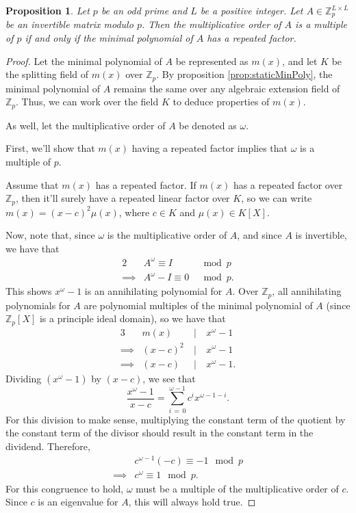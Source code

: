 \documentclass[12pt, a4paper, reqno]{amsart}
\newtheorem{prop}{Proposition}
\newcommand\divides{\ | \ }
\begin{document}
	\begin{prop}
		Let $p$ be an odd prime and $L$ be a positive integer. Let $A \in \mathds{Z}_{p}^{L \times L}$ be an invertible matrix modulo $p$. Then the multiplicative order of
		$A$ is a multiple of $p$ if and only if the minimal polynomial of $A$ has a repeated factor.
	\end{prop}
	\begin{proof}
		Let the minimal polynomial of $A$ be represented as $m(x)$, and let $K$ be the splitting field of $m(x)$ over $\mathds{Z}_p$. By proposition 
		\ref{prop:staticMinPoly}, the minimal polynomial of $A$ remains the same over any algebraic extension field of $\mathds{Z}_p$. Thus, we 
		can work over the field $K$ to deduce properties of $m(x)$.
		
		As well, let the multiplicative order of $A$ be denoted as $\omega$.
		
		First, we'll show that $m(x)$ having a repeated factor implies that $\omega$ is a multiple of $p$.
		
		Assume that $m(x)$ has a repeated factor. If $m(x)$ has a repeated factor over $\mathds{Z}_p$, then it'll surely have a repeated linear factor over $K$, so we can 
		write $m(x) = (x - c)^2\mu(x)$, where $c \in K$ and $\mu(x) \in K[X]$.
		
		Now, note that, since $\omega$ is the multiplicative order of $A$, and since $A$ is invertible, we have that
		\begin{alignat*}{2}
			         & A^\omega \equiv I & \mod{p} \\
			\implies & A^\omega - I \equiv 0 & \mod{p}.
		\end{alignat*}
		This shows $x^\omega - 1$ is an annihilating polynomial for $A$. Over $\mathds{Z}_p$, all annihilating polynomials for $A$ are polynomial multiples of the minimal
		polynomial of $A$ (since $\mathds{Z}_p[X]$ is a principle ideal domain), so we have that
		\begin{alignat*}{3}
			         & m(x) & \divides & x^\omega - 1      \\
			\implies & (x - c)^2 & \divides & x^\omega - 1 \\
			\implies & (x - c) & \divides & x^\omega - 1.
		\end{alignat*}
		Dividing $(x^\omega - 1)$ by $(x - c)$, we see that
		\begin{equation}
			\label{eq:firstDivision}
			\frac{x^\omega - 1}{x - c} = \sum_{i\,=\,0}^{\omega-1} c^ix^{\omega - 1 - i}.
		\end{equation}
		For this division to make sense, multiplying the constant term of the quotient by the constant term of the divisor should result in the constant term in the
		dividend. Therefore,
		\begin{align*}
			         & c^{\omega - 1}(-c) \equiv -1 \mod{p} \\
			\implies & c^\omega \equiv 1 \mod{p}.
		\end{align*}
		For this congruence to hold, $\omega$ must be a multiple of the multiplicative order of $c$. Since $c$ is an eigenvalue for $A$, this will always hold true.
		

\end{proof}
\end{document}
